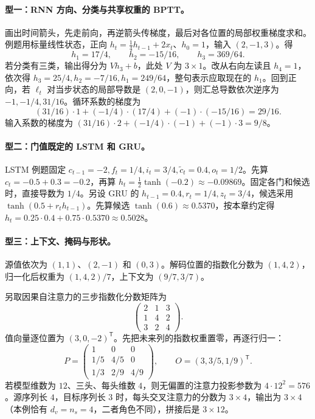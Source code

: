 \documentclass[UTF8,a4paper,zihao=-4,fontset=fandol]{ctexrep}
\begin{document}
\paragraph{型一：RNN 方向、分类与共享权重的 BPTT。}
画出时间箭头，先走前向，再逆箭头传梯度，最后对各位置的局部权重梯度求和。例题用标量线性状态，正向 $h_t=\frac14h_{t-1}+2x_t$、$h_0=1$，输入 $(2,-1,3)$。得
\[
 h_1=17/4,\qquad h_2=-15/16,\qquad h_3=369/64.
\]
若分类有三类，输出得分为 $Vh_3+b$，此处 $V$ 为 $3\times1$。改从右向左读且 $h_4=1$，依次得 $h_3=25/4,h_2=-7/16,h_1=249/64$，整句表示应取现在的 $h_1$。回到正向，若 $\ell_t$ 对当步状态的局部导数是 $(2,0,-1)$，则汇总导数依次逆序为 $-1,-1/4,31/16$。循环系数的梯度为
\[
 (31/16)\cdot1+(-1/4)\cdot(17/4)+(-1)\cdot(-15/16)=29/16.
\]
输入系数的梯度为 $(31/16)\cdot2+(-1/4)\cdot(-1)+(-1)\cdot3=9/8$。

\paragraph{型二：门值既定的 LSTM 和 GRU。}
LSTM 例题固定 $c_{t-1}=-2,f_t=1/4,i_t=3/4,\widetilde c_t=0.4,o_t=1/2$。先算 $c_t=-0.5+0.3=-0.2$，再算 $h_t=\tfrac12\tanh(-0.2)\approx-0.09869$。固定各门和候选时，直接导数为 $1/4$。另设 GRU 的 $h_{t-1}=0.4,r_t=1/4,z_t=3/4$，候选采用 $\tanh(0.5+r_th_{t-1})$。先算候选 $\tanh(0.6)\approx0.5370$，按本章约定得 $h_t=0.25\cdot0.4+0.75\cdot0.5370\approx0.5028$。

\paragraph{型三：上下文、掩码与形状。}
源值依次为 $(1,1)$、$(2,-1)$ 和 $(0,3)$。解码位置的指数化分数为 $(1,4,2)$，归一化后权重为 $(1,4,2)/7$，上下文为 $(9/7,3/7)$。

另取因果自注意力的三步指数化分数矩阵为
\[
\begin{pmatrix}2&1&3\\1&4&2\\3&2&4\end{pmatrix}.
\]
值向量逐位置为 $(3,0,-2)^{\mathsf T}$。先把未来列的指数权重置零，再逐行归一：
\[
 P=\begin{pmatrix}1&0&0\\1/5&4/5&0\\1/3&2/9&4/9\end{pmatrix},
 \qquad O=(3,3/5,1/9)^{\mathsf T}.
\]
若模型维数为 $12$、三头、每头维数 $4$，则无偏置的注意力投影参数为 $4\cdot12^2=576$。源序列长 $4$，目标序列长 $3$ 时，每头交叉注意力的分数为 $3\times4$，输出为 $3\times4$（本例恰有 $d_v=n_s=4$，二者角色不同），拼接后是 $3\times12$。
\end{document}
